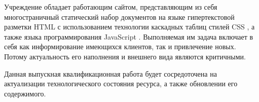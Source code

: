 Учреждение обладает работающим сайтом, представляющим из себя многостраничный статический набор документов на языке гипертекстовой разметки HTML \cite{wiki-html} с использованием технологии каскадных таблиц стилей CSS \cite{wiki-css}, а также языка программирования JavaScript \cite{wiki-js}.
Выполняемая им задача включает в себя как информирование имеющихся клиентов, так и привлечение новых.
Потому актуальность его наполнения и внешнего вида являются критичными.

\begin{comment}
    Cайт Учреждения уступает современным трендам по нескольким показателям:
    \begin{itemize}
        \item технический -- исполнение содержимого сайта является неактуальным с точки зрения используемых технологий;
        \item функциональный -- возможности, предоставляемые сайтом не соответствуют потребностям Учреждения;
        \item информационный -- часть информации является устаревшей и неактуальной, требует замены;
        \item визуальный -- внешнее оформление сайта не соответствует современным подходам к проектированию и оформлению web-ресурсов.
    \end{itemize}    
\end{comment}

Данная выпускная квалификационная работа будет сосредоточена на актуализации технологического состояния ресурса, а также обновлении его содержимого.

\clearpage
